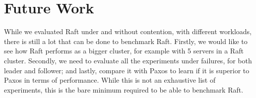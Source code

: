 \section{Future Work}

While we evaluated Raft under and without contention, with different workloads, there is still a lot that can be done to benchmark Raft. Firstly, we would like to see how Raft performs as a bigger cluster, for example with 5 servers in a Raft cluster. Secondly, we need to evaluate all the experiments under failures, for both leader and follower; and lastly, compare it with Paxos to learn if it is superior to Paxos in terms of performance. While this is not an exhaustive list of experiments, this is the bare minimum required to be able to benchmark Raft.